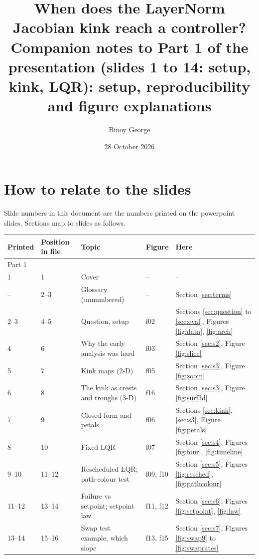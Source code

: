 \documentclass[11pt]{article}
\title{When does the LayerNorm Jacobian kink reach a controller?\\[0.3em]
\large Companion notes to Part 1 of the presentation (slides 1 to 14: setup, kink, LQR): setup, reproducibility and figure explanations}
\author{Binoy George}
\date{28 October 2026}
\begin{document}
\maketitle
{\setlength{\parskip}{0pt}\tableofcontents}
\newpage

\section{How to relate to the slides}

Slide numbers in this document are the numbers printed on the powerpoint slides. Sections map to slides as follows.

\begin{center}
\footnotesize
\setlength{\tabcolsep}{4pt}
\begin{tabular}{lllll}
\toprule
Printed & Position in file & Topic & Figure & Here \\
\midrule
\multicolumn{5}{l}{Part 1} \\
1 & 1 & Cover & -- & -- \\
-- & 2--3 & Glossary (unnumbered) & -- & Section \ref{sec:terms} \\
2--3 & 4--5 & Question, setup & f02 & Sections \ref{sec:question} to \ref{sec:eval}, Figures \ref{fig:data}, \ref{fig:arch} \\
4 & 6 & Why the early analysis was hard & f03 & Section \ref{sec:s2}, Figure \ref{fig:slice} \\
5 & 7 & Kink maps (2-D) & f05 & Section \ref{sec:s3}, Figure \ref{fig:zoom} \\
6 & 8 & The kink as crests and troughs (3-D) & f16 & Section \ref{sec:s3}, Figure \ref{fig:surf3d} \\
7 & 9 & Closed form and petals & f06 & Sections \ref{sec:kink}, \ref{sec:s3}, Figure \ref{fig:petals} \\
8 & 10 & Fixed LQR & f07 & Section \ref{sec:s4}, Figures \ref{fig:four}, \ref{fig:timeline} \\
9--10 & 11--12 & Rescheduled LQR; path-colour test & f09, f10 & Section \ref{sec:s5}, Figures \ref{fig:resched}, \ref{fig:pathcolour} \\
11--12 & 13--14 & Failure vs setpoint; setpoint law & f11, f12 & Section \ref{sec:s6}, Figures \ref{fig:setpoint}, \ref{fig:law} \\
13--14 & 15--16 & Swap test example; which slope & f13, f15 & Section \ref{sec:s7}, Figures \ref{fig:swap9} to \ref{fig:swaprates} \\

\end{tabular}
\end{center}
\end{document}
